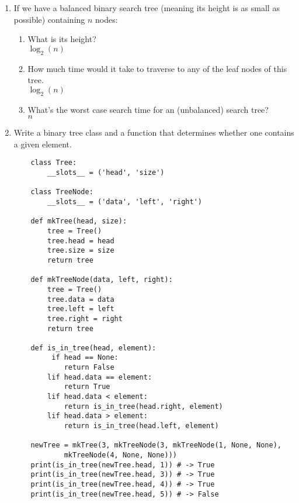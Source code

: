 \documentclass[11pt]{article}
\newenvironment{answer}{\large\lstset{basicstyle=\tiny\ttfamily}\color{white}}{}
\newenvironment{answer}{\large\lstset{basicstyle=\large\ttfamily}\color{red}}{}
\begin{document}
\begin{enumerate}
\item If we have a balanced binary search tree (meaning its height is as small as
    possible) containing $n$ nodes:
        \begin{enumerate}
            \item What is its height? \\
                \begin{answer}
                $\log_2(n)$
                \end{answer}
            \item How much time would it take to traverse to any of the leaf
            nodes of this tree. \\
                \begin{answer}
                $\log_2(n)$
                \end{answer}
            \item What's the worst case search time for an (unbalanced) search
            tree? \\
                \begin{answer}
                $n$
                \end{answer}
        \end{enumerate}
\pagebreak
\item Write a binary tree class and a function that determines whether one contains a given element.
		\begin{answer}
		\begin{lstlisting}
	class Tree:
		__slots__ = ('head', 'size')

	class TreeNode:
		__slots__ = ('data', 'left', 'right')

	def mkTree(head, size):
		tree = Tree()
		tree.head = head
		tree.size = size
		return tree

	def mkTreeNode(data, left, right):
		tree = Tree()
		tree.data = data
		tree.left = left
		tree.right = right
		return tree

	def is_in_tree(head, element):
		 if head == None:
			return False
		lif head.data == element:
			return True
		lif head.data < element:
			return is_in_tree(head.right, element)
		lif head.data > element:
			return is_in_tree(head.left, element)

	newTree = mkTree(3, mkTreeNode(3, mkTreeNode(1, None, None),
			mkTreeNode(4, None, None)))
	print(is_in_tree(newTree.head, 1)) # -> True
	print(is_in_tree(newTree.head, 3)) # -> True
	print(is_in_tree(newTree.head, 4)) # -> True
	print(is_in_tree(newTree.head, 5)) # -> False
		\end{lstlisting}
		\end{answer}


\end{enumerate}
\end{document}
